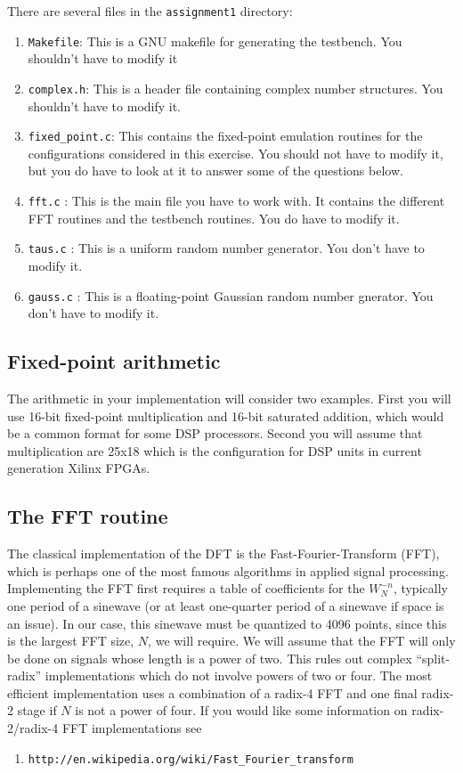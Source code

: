\documentclass[11pt]{article}
\begin{document}
There are several files in the {\tt assignment1} directory:
\begin{enumerate}
\item {\tt Makefile}: This is a GNU makefile for generating the testbench. You shouldn't have to modify it
\item {\tt complex.h}:  This is a header file containing complex number structures.  You shouldn't have to modify it.
\item {\tt fixed\_point.c}: This contains the fixed-point emulation routines for the configurations considered in this exercise.  You should not have to modify it, but you do have to look at it to answer some of the questions below.
\item {\tt fft.c} : This is the main file you have to work with.  It contains the different FFT routines and the testbench routines.  You do have to modify it.
\item {\tt taus.c} : This is a uniform random number generator.  You don't have to modify it.
\item {\tt gauss.c} : This is a floating-point Gaussian random number gnerator.  You don't have to modify it. 
\end{enumerate}

\subsection{Fixed-point arithmetic}
The arithmetic in your implementation will consider two examples.  First you will use 16-bit fixed-point multiplication and 
16-bit saturated addition, which would be a common format for some DSP processors. Second you will assume that multiplication are
25x18 which is the configuration for DSP units in current generation Xilinx FPGAs.


\subsection{The FFT routine}
The classical implementation of the DFT is the Fast-Fourier-Transform (FFT), which is perhaps one of the most
famous algorithms in applied signal processing.  Implementing the FFT first requires a table of coefficients for the $W_N^{-n}$, 
typically one period of a sinewave (or at least one-quarter period of a sinewave if space is an issue).  In our case, 
this sinewave must be quantized to 4096 points, since this is the largest FFT size, $N$, we will require.  We will assume that 
the FFT will only be done on signals whose length is a power of two.  This rules out complex ``split-radix'' implementations 
which do not involve powers of two or four.  The most efficient implementation uses a combination of a radix-4 FFT and one final 
radix-2 stage if $N$ is not a power of four.  If you would like some information on radix-2/radix-4 FFT implementations 
see \par
\begin{small}
\begin{enumerate}
\item {\tt http://en.wikipedia.org/wiki/Fast\_Fourier\_transform}
\end{enumerate}
\end{small}
\end{document}

